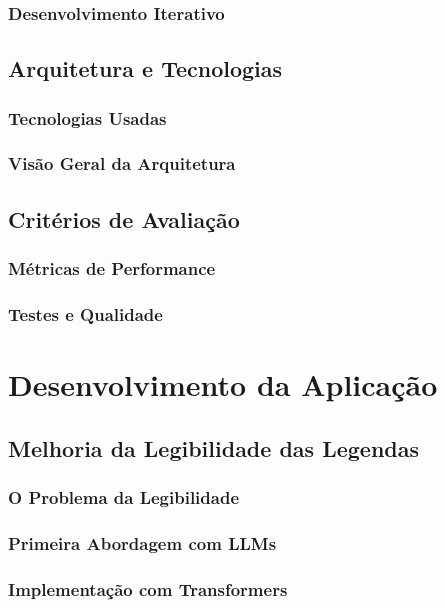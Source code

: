 \documentclass[tcc,capa]{texufpel}
\begin{document}
\subsection{Desenvolvimento Iterativo}

\section{Arquitetura e Tecnologias}
\subsection{Tecnologias Usadas}
\subsection{Visão Geral da Arquitetura}

\section{Critérios de Avaliação}
\subsection{Métricas de Performance}
\subsection{Testes e Qualidade}

\chapter{Desenvolvimento da Aplicação}

\section{Melhoria da Legibilidade das Legendas}
\subsection{O Problema da Legibilidade}





\subsection{Primeira Abordagem com LLMs}
\subsection{Implementação com Transformers}
\end{document}
